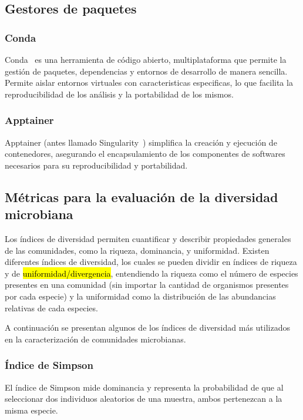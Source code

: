 \subsection{Gestores de paquetes}
\subsubsection{Conda}
Conda~\cite{anaconda}  es una herramienta de código abierto, multiplataforma  que permite la gestión de paquetes, dependencias y entornos de desarrollo de manera sencilla. Permite aislar entornos virtuales con caracteristicas especificas, lo que facilita la reproducibilidad de los análisis y la portabilidad de los mismos.
\subsubsection{Apptainer}
Apptainer (antes llamado Singularity~\cite{kurtzer2017singularity}) simplifica la creación y ejecución de contenedores, asegurando el encapsulamiento de los componentes de softwares necesarios para su reproducibilidad y portabilidad.  

\subsection{Métricas para la evaluación de la diversidad microbiana}
Los índices de diversidad permiten cuantificar y describir propiedades generales de las comunidades, como la riqueza, dominancia, y uniformidad.  %
Existen diferentes índices de diversidad, los cuales se pueden dividir en índices de riqueza y de \hl{uniformidad/divergencia}, entendiendo la riqueza como el número de especies presentes en una comunidad (sin importar la cantidad de organismos presentes por cada especie) y la uniformidad como la distribución de las abundancias relativas de cada especies.

A continuación se presentan algunos de los índices de diversidad más utilizados en la caracterización de comunidades microbianas.   


\subsubsection{Índice de Simpson}
El índice de Simpson mide dominancia y representa la probabilidad de que al seleccionar dos individuos aleatorios de una muestra, ambos pertenezcan a la misma especie. 

